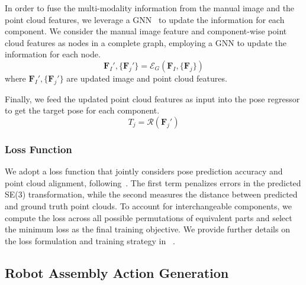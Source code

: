 In order to fuse the multi-modality information from the manual image and the point cloud features, we leverage a GNN~\citep{wu2020comprehensive} to update the information for each component.
We consider the manual image feature and component-wise point cloud features as nodes in a complete graph, employing a GNN to update the information for each node.
\begin{equation}
    \mathbf{F}_I',\{\mathbf{F}_j'\} = \mathcal{E}_G(\mathbf{F}_I,\{\mathbf{F}_j\})
\end{equation}
where $\mathbf{F}_I',\{\mathbf{F}_j'\}$ are updated image and point cloud features.

Finally, we feed the updated point cloud features as input into the pose regressor to get the target pose for each component.
\begin{equation}
    T_j = \mathcal{R}(\mathbf{F}_j')
\end{equation}

\subsubsection{Loss Function} We adopt a loss function that jointly considers pose prediction accuracy and point cloud alignment, following~\citep{zhang2024manual,li2024category}. The first term penalizes errors in the predicted SE(3) transformation, while the second measures the distance between predicted and ground truth point clouds. To account for interchangeable components, we compute the loss across all possible permutations of equivalent parts and select the minimum loss as the final training objective. We provide further details on the loss formulation and training strategy in
~.


\subsection{Robot Assembly Action Generation}  
\label{sec:method-action}  

